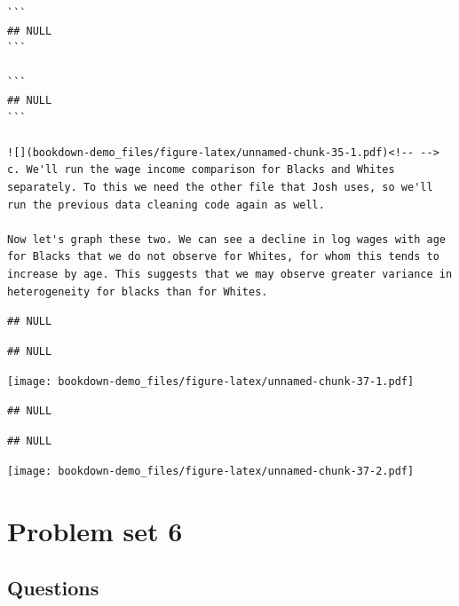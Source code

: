 \documentclass[]{book}
\begin{document}
\begin{verbatim}
```
## NULL
```

```
## NULL
```

![](bookdown-demo_files/figure-latex/unnamed-chunk-35-1.pdf)<!-- --> 
c. We'll run the wage income comparison for Blacks and Whites separately. To this we need the other file that Josh uses, so we'll run the previous data cleaning code again as well.   

Now let's graph these two. We can see a decline in log wages with age for Blacks that we do not observe for Whites, for whom this tends to increase by age. This suggests that we may observe greater variance in heterogeneity for blacks than for Whites.   
\end{verbatim}

\begin{verbatim}
## NULL
\end{verbatim}

\begin{verbatim}
## NULL
\end{verbatim}

\texttt{[image: bookdown-demo\_files/figure-latex/unnamed-chunk-37-1.pdf]}

\begin{verbatim}
## NULL
\end{verbatim}

\begin{verbatim}
## NULL
\end{verbatim}

\texttt{[image: bookdown-demo\_files/figure-latex/unnamed-chunk-37-2.pdf]}

\hypertarget{problem-set-6}{%
\chapter{Problem set 6}\label{problem-set-6}}

\hypertarget{questions-3}{%
\section{Questions}\label{questions-3}}
\end{document}
